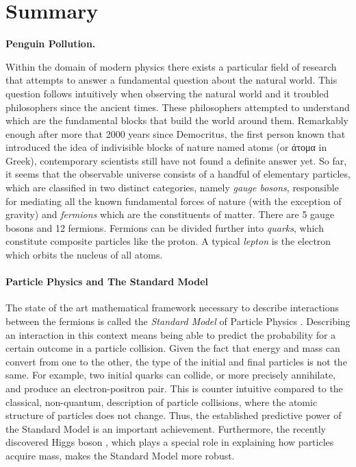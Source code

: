 \chapter*{Summary}
\chaptermark{}

{\Large\bf
  Penguin Pollution.
}
\vspace*{0.05\textwidth}

Within the domain of modern physics there exists a particular field of research
that attempts to answer a fundamental question about the natural world. This
question follows intuitively when observing the natural world and it troubled
philosophers since the ancient times. These philosophers attempted to understand
which are the fundamental blocks that build the world around them. Remarkably
enough after more that 2000 years since Democritus, the first person known that
introduced the idea of indivisible blocks of nature named atoms (or \textgreek{άτομα} in Greek),
contemporary scientists still have not found a definite answer yet. So far, it seems that the observable
universe consists of a handful of elementary particles, which are classified in two
distinct categories, namely {\it gauge bosons}, responsible for mediating all the
known fundamental forces of nature (with the exception of gravity) and {\it fermions}
which are the constituents of matter. There are 5 gauge bosons and 12 fermions.
Fermions can be divided further into {\it quarks}, which constitute composite
particles like the proton. A typical {\it lepton} is the electron which orbits
the nucleus of all atoms.

\subsubsection{Particle Physics and The Standard Model}
The state of the art mathematical framework necessary to describe interactions between the
fermions is called the \textit{Standard Model} of Particle Physics \cite{sm-glashow,sm-weinberg,sm-salam}.
Describing an interaction in this context means being able to predict the probability for a certain
outcome in a particle collision. Given the fact that energy and mass can convert
from one to the other, the type of the initial and final particles is not the same. For example,
two initial quarks can collide, or more precisely annihilate, and produce an electron-positron pair.
This is counter intuitive compared to the classical, non-quantum, description of particle collisions,
where the atomic structure of particles does not change. Thus, the established predictive power of
the Standard Model is an important achievement. Furthermore, the recently
discovered Higgs boson \cite{higgs-cms,higgs-atlas}, which plays a special role in explaining how
particles acquire mass, makes the Standard Model more robust.

